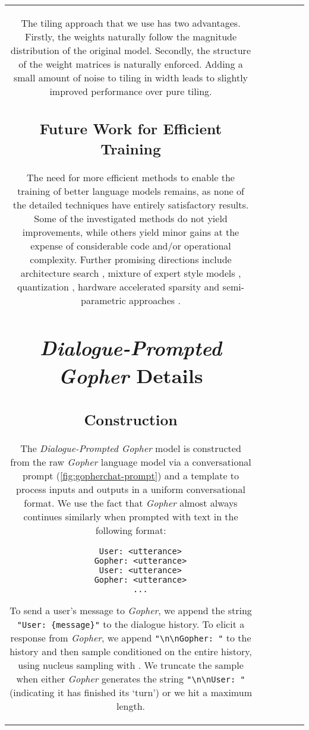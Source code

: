 \documentclass[11pt, a4paper, logo, internal, copyright, nonumbering]{deepmind}
\newcommand{\gopher}{\textit{Gopher}\xspace}
\newcommand{\gopherchat}{\textit{Dialogue-Prompted Gopher}\xspace}
\begin{document}
\begin{center}
\begin{longtable}{cclccc}
{The tiling approach that we use has two advantages. Firstly, the weights naturally follow the magnitude distribution of the original model.
Secondly, the structure of the weight matrices is naturally enforced.
Adding a small amount of noise to tiling in width leads to slightly improved performance over pure tiling.

\subsection{Future Work for Efficient Training}

The need for more efficient methods to enable the training of better language models remains, as none of the detailed techniques have entirely satisfactory results. Some of the investigated methods do not yield improvements, while others yield minor gains at the expense of considerable code and/or operational complexity.
Further promising directions include architecture search \citep{so2021primer, pmlr-v97-so19a}, mixture of expert style models \citep{fedus2021switch, roller2021hash, lewis2021base, kim2021scalable}, quantization \citep{q8bert}, hardware accelerated sparsity \citep{mishra2021accelerating} and semi-parametric approaches \citep{guu2020realm, Khandelwal2020Generalization, perez2019finding, borgeaud2021retrieval}. 

\section{\gopherchat Details}
\label{appendix:gopherchat}

\subsection{Construction}
\label{appendix:gopherchat-construction}

The \gopherchat model is constructed from the raw \gopher language model via a conversational prompt (\autoref{fig:gopherchat-prompt}) and a template to process inputs and outputs in a uniform conversational format. We use the fact that \gopher almost always continues similarly when prompted with text in the following format:
\begin{verbatim}
    User: <utterance>
    Gopher: <utterance>
    User: <utterance>
    Gopher: <utterance>
    ...
\end{verbatim}
To send a user's message to \gopher, we append the string \texttt{"User: \{message\}"} to the dialogue history. To elicit a response from \gopher, we append \texttt{"\textbackslash n\textbackslash nGopher: "} to the history and then sample conditioned on the entire history, using nucleus sampling with  \citep{holtzman2019curious}. We truncate the sample when either \gopher generates the string \texttt{"\textbackslash n\textbackslash nUser: "} (indicating it has finished its `turn') or we hit a maximum length.

}
\end{longtable}
\end{center}
\end{document}

